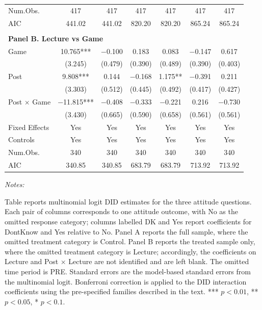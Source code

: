 \begin{table}[htbp]
\begin{tabular}{lcccccc}
Num.Obs. & \num{417} & \num{417} & \num{417} & \num{417} & \num{417} & \num{417} \\
AIC & \num{441.02} & \num{441.02} & \num{820.20} & \num{820.20} & \num{865.24} & \num{865.24} \\
\\
\multicolumn{7}{l}{\textbf{Panel B. Lecture vs Game}} \\
\hline
Game & \num{10.765}*** & \num{-0.100} & \num{0.183} & \num{0.083} & \num{-0.147} & \num{0.617} \\
 & (\num{3.245}) & (\num{0.479}) & (\num{0.390}) & (\num{0.489}) & (\num{0.390}) & (\num{0.403}) \\
Post & \num{9.808}*** & \num{0.144} & \num{-0.168} & \num{1.175}** & \num{-0.391} & \num{0.211} \\
 & (\num{3.303}) & (\num{0.512}) & (\num{0.445}) & (\num{0.492}) & (\num{0.417}) & (\num{0.427}) \\
Post $\times$ Game & \num{-11.815}*** & \num{-0.408} & \num{-0.333} & \num{-0.221} & \num{0.216} & \num{-0.730} \\
 & (\num{3.430}) & (\num{0.665}) & (\num{0.590}) & (\num{0.658}) & (\num{0.561}) & (\num{0.561}) \\
\hline
Fixed Effects & Yes & Yes & Yes & Yes & Yes & Yes \\
Controls & Yes & Yes & Yes & Yes & Yes & Yes \\
Num.Obs. & \num{340} & \num{340} & \num{340} & \num{340} & \num{340} & \num{340} \\
AIC & \num{340.85} & \num{340.85} & \num{683.79} & \num{683.79} & \num{713.92} & \num{713.92} \\
\hline
\hline
\end{tabular}
{\begin{flushleft}\parbox{\textwidth}{\tiny \hspace*{0.1cm}
\textit{Notes:}} Table reports multinomial logit DID estimates for the three attitude questions. Each pair of columns corresponds to one attitude outcome, with No as the omitted response category; columns labelled DK and Yes report coefficients for DontKnow and Yes relative to No. Panel A reports the full sample, where the omitted treatment category is Control. Panel B reports the treated sample only, where the omitted treatment category is Lecture; accordingly, the coefficients on Lecture and Post $\times$ Lecture are not identified and are left blank. The omitted time period is PRE. Standard errors are the model-based standard errors from the multinomial logit. Bonferroni correction is applied to the DID interaction coefficients using the pre-specified families described in the text. *** $p < 0.01$, ** $p < 0.05$, * $p < 0.1$.
\end{flushleft}}
\end{table}
